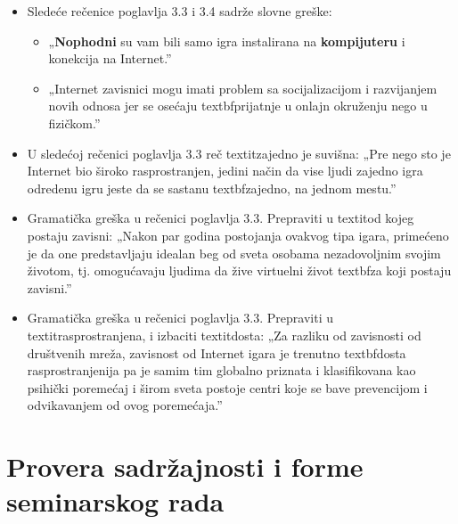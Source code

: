 \documentclass[a4paper]{report}
\begin{document}
\begin{itemize}
    \item Sledeće rečenice poglavlja 3.3 i 3.4 sadrže slovne greške:\newline
    \begin{itemize}
        \item „\textbf{Nophodni} su vam bili samo igra instalirana na \textbf{kompijuteru} i konekcija na Internet.”
    \end{itemize}
    \begin{itemize}
        \item  „Internet zavisnici mogu imati problem sa socijalizacijom i razvijanjem novih odnosa jer se osećaju textbf{prijatnje} u onlajn okruženju nego u fizičkom.”
    \end{itemize}
\end{itemize}
\begin{itemize}
    \item U sledećoj rečenici poglavlja 3.3 reč textit{zajedno} je suvišna: \newline
    „Pre nego sto je Internet bio široko rasprostranjen, jedini način da vise ljudi zajedno igra odredenu igru jeste da se sastanu textbf{zajedno}, na jednom mestu.”
\end{itemize}
\begin{itemize}
    \item Gramatička greška u rečenici poglavlja 3.3. Prepraviti u textit{od kojeg postaju zavisni}:
    \newline
    „Nakon par godina postojanja ovakvog tipa igara, primećeno je da one predstavljaju idealan beg od sveta osobama nezadovoljnim svojim životom, tj. omogućavaju ljudima da žive virtuelni život textbf{za koji postaju zavisni}.”
\end{itemize}
\begin{itemize}
    \item Gramatička greška u rečenici poglavlja 3.3. Prepraviti u textit{rasprostranjena}, i izbaciti textit{dosta}:
    \newline
    „Za razliku od zavisnosti od društvenih mreža, zavisnost od Internet igara je trenutno textbf{dosta rasprostranjenija} pa je samim tim globalno priznata i klasifikovana kao psihički poremećaj i širom sveta postoje centri koje se bave prevencijom i odvikavanjem od ovog poremećaja.”
\end{itemize}
\section{Provera sadržajnosti i forme seminarskog rada}
\end{document}
